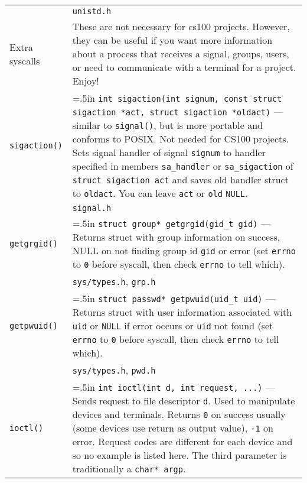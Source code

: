 \documentclass{article}
\newcommand{\indenth}[1][.5]{\hangindent=#1in
                         \hangafter=1 }
\begin{document}
\begin{longtabu}{p{1in}|p{5.7in}}
        \\
    & \texttt{unistd.h}
        \\
    Extra syscalls & These are not necessary for cs100 projects. However, they can be useful if you want more information about a process that receives a signal, groups, users, or need to communicate with a terminal for a project. Enjoy!
        \\ \hline
    \texttt{sigaction()} & \indenth\texttt{int sigaction(int signum, const struct sigaction *act, struct sigaction *oldact)} --- similar to \texttt{signal()}, but is more portable and conforms to POSIX. Not needed for CS100 projects. Sets signal handler of signal \texttt{signum} to handler specified in members \texttt{sa\_handler} or \texttt{sa\_sigaction} of \texttt{struct sigaction act} and saves old handler struct to \texttt{oldact}.  You can leave \texttt{act} or \texttt{old} \texttt{NULL}.
        \\
    & \texttt{signal.h}
        \\ 
    \texttt{getgrgid()} & \indenth\texttt{struct group* getgrgid(gid\_t gid)} --- Returns struct with group information on success, NULL on not finding group id \texttt{gid} or error (set \texttt{errno} to \texttt{0} before syscall, then check \texttt{errno} to tell which). 
        \\
    & \texttt{sys/types.h}, \texttt{grp.h}
        \\
    \texttt{getpwuid()} & \indenth\texttt{struct passwd* getpwuid(uid\_t uid)} --- Returns struct with user information associated with \texttt{uid} or \texttt{NULL} if error occurs or \texttt{uid} not found (set \texttt{errno} to \texttt{0} before syscall, then check \texttt{errno} to tell which).
        \\
    & \texttt{sys/types.h}, \texttt{pwd.h}
        \\ \hline
    \texttt{ioctl()} & \indenth\texttt{int ioctl(int d, int request, ...)} --- Sends request to file descriptor \texttt{d}.  Used to manipulate devices and terminals. Returns \texttt{0} on success usually (some devices use return as output value), \texttt{-1} on error. Request codes are different for each device and so no example is listed here. The third parameter is traditionally a \texttt{char* argp}.
\end{longtabu}
\end{document}
